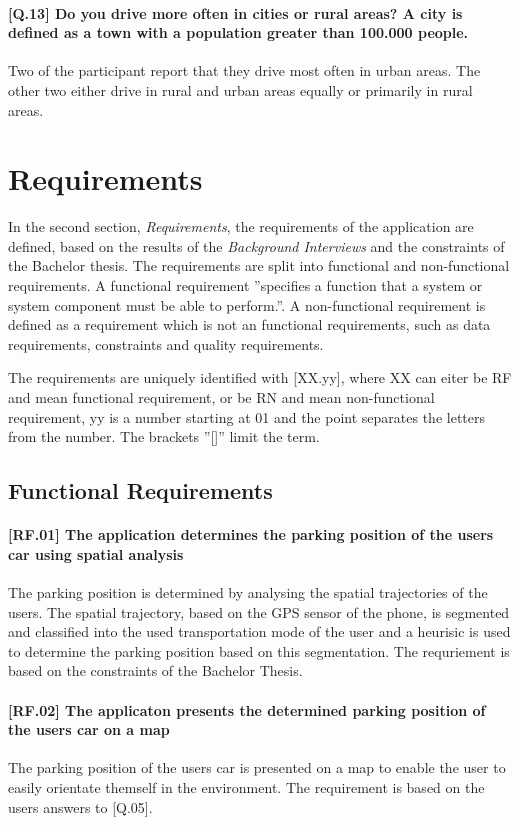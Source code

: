 \paragraph{[Q.13] Do you drive more often in cities or rural areas? A city is defined as a town with a population greater than 100.000 people.}
Two of the participant report that they drive most often in urban areas. The other two either drive in rural and urban areas equally or primarily in rural areas.


\section{Requirements}
In the second section, \textit{Requirements}, the requirements of the application are defined, based on the results of the \textit{Background Interviews} and the constraints of the Bachelor thesis. The requirements are split into functional and non-functional requirements. A functional requirement ''specifies a function that a system or system component must be able to perform.''. A non-functional requirement is defined as a requirement which is not an functional requirements, such as data requirements, constraints and quality requirements. \cite{eide2005quantification}

The requirements are uniquely identified with [XX.yy], where XX can eiter be RF and mean functional requirement, or be RN and mean non-functional requirement, yy is a number starting at 01 and the point separates the letters from the number. The brackets ''[]'' limit the term.  

\subsection{Functional Requirements}

\paragraph{[RF.01] The application determines the parking position of the users car using spatial analysis}
The parking position is determined by analysing the spatial trajectories of the users. The spatial trajectory, based on the GPS sensor of the phone, is segmented and classified into the used transportation mode of the user and a heurisic is used to determine the parking position based on this segmentation. The requriement is based on the constraints of the Bachelor Thesis. 

\paragraph{[RF.02] The applicaton presents the determined parking position of the users car on a map}
The parking position of the users car is presented on a map to enable the user to easily orientate themself in the environment. The requirement is based on the users answers to [Q.05].

